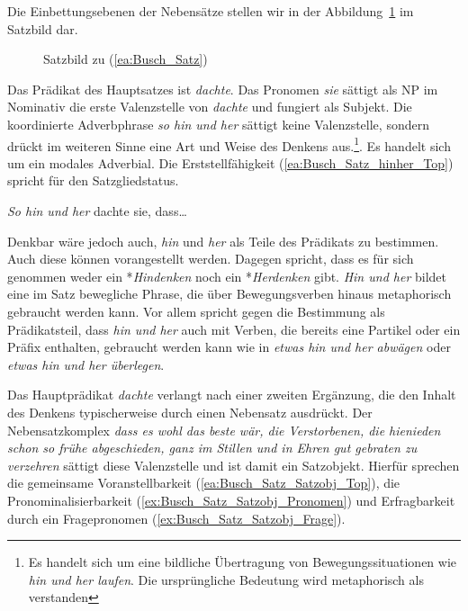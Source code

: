 Die Einbettungsebenen der Nebensätze stellen wir in der Abbildung~\ref{Abb:Satzbild_Max_Moritz} im Satzbild dar.

\begin{figure}
    \centering
    
    \caption{Satzbild zu (\ref{ea:Busch_Satz})}
    \label{Abb:Satzbild_Max_Moritz}
\end{figure}

Das Prädikat des Hauptsatzes ist \textit{dachte}. Das Pronomen \textit{sie} sättigt als NP im Nominativ die erste Valenzstelle von \textit{dachte} und fungiert als Subjekt. Die koordinierte Adverbphrase \textit{so hin und her} sättigt keine Valenzstelle, sondern drückt im weiteren Sinne eine Art und Weise des Denkens aus.\footnote{Es handelt sich um eine bildliche Übertragung von Bewegungssituationen wie \textit{hin und her laufen}. Die ursprüngliche Bedeutung  wird metaphorisch als  verstanden}. Es handelt sich um ein modales Adverbial. Die Erststellfähigkeit (\ref{ea:Busch_Satz_hinher_Top}) spricht für den Satzgliedstatus.

\ea \label{ea:Busch_Satz_hinher_Top} \textit{So hin und her} dachte sie, dass\ldots{} 
\z 

Denkbar wäre jedoch auch, \textit{hin} und \textit{her} als Teile des Prädikats zu bestimmen. Auch diese können vorangestellt werden. Dagegen spricht, dass es für sich genommen weder ein *\textit{Hindenken} noch ein *\textit{Herdenken} gibt. \textit{Hin und her} bildet eine im Satz bewegliche Phrase, die über Bewegungsverben hinaus metaphorisch gebraucht werden kann. Vor allem spricht gegen die Bestimmung als Prädikatsteil, dass \textit{hin und her} auch mit Verben, die bereits eine Partikel oder ein Präfix enthalten, gebraucht werden kann wie in \textit{etwas hin und her abwägen} oder \textit{etwas hin und her überlegen}.    
 
Das Hauptprädikat \textit{dachte} verlangt nach einer zweiten Ergänzung, die den Inhalt des Denkens typischerweise durch einen Nebensatz ausdrückt. Der Nebensatzkomplex \textit{dass es wohl das beste wär, die Verstorbenen, die hienieden schon so frühe abgeschieden, ganz im Stillen und in Ehren gut gebraten zu verzehren} sättigt diese Valenzstelle und ist damit ein Satzobjekt. Hierfür sprechen die gemeinsame Voranstellbarkeit (\ref{ea:Busch_Satz_Satzobj_Top}), die Pronominalisierbarkeit (\ref{ex:Busch_Satz_Satzobj_Pronomen}) und Erfragbarkeit durch ein Fragepronomen (\ref{ex:Busch_Satz_Satzobj_Frage}).

